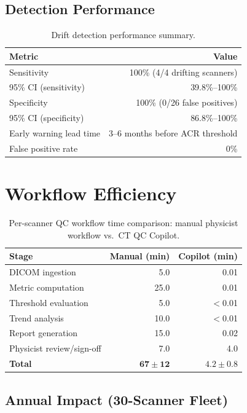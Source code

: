 \documentclass[11pt]{article}
\begin{document}
\subsection{Detection Performance}

\begin{table}[htbp]
\centering
\caption{Drift detection performance summary.}
\begin{tabular}{lr}
\toprule
\textbf{Metric} & \textbf{Value} \\
\midrule
Sensitivity              & 100\% (4/4 drifting scanners) \\
95\% CI (sensitivity)    & 39.8\%--100\% \\
Specificity              & 100\% (0/26 false positives) \\
95\% CI (specificity)    & 86.8\%--100\% \\
Early warning lead time  & 3--6 months before ACR threshold \\
False positive rate      & 0\% \\
\bottomrule
\end{tabular}
\end{table}

\section{Workflow Efficiency}

\begin{table}[htbp]
\centering
\caption{Per-scanner QC workflow time comparison: manual physicist workflow vs.\ CT QC Copilot.}
\begin{tabular}{lrr}
\toprule
\textbf{Stage} & \textbf{Manual (min)} & \textbf{Copilot (min)} \\
\midrule
DICOM ingestion          & 5.0   & 0.01 \\
Metric computation       & 25.0  & 0.01 \\
Threshold evaluation     & 5.0   & $<$0.01 \\
Trend analysis           & 10.0  & $<$0.01 \\
Report generation        & 15.0  & 0.02 \\
Physicist review/sign-off & 7.0  & 4.0 \\
\midrule
\textbf{Total}           & $\mathbf{67 \pm 12}$ & $\mathbf{4.2 \pm 0.8}$ \\
\bottomrule
\end{tabular}
\end{table}

\subsection{Annual Impact (30-Scanner Fleet)}
\end{document}
